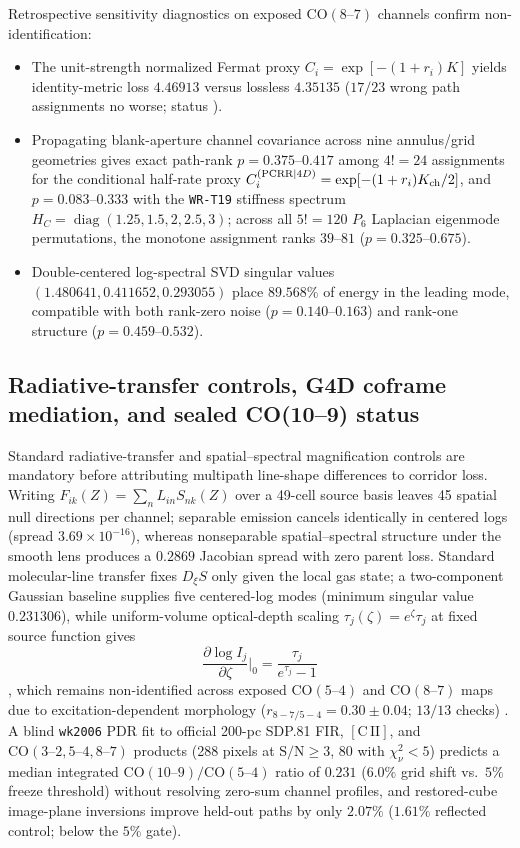 \documentclass[11pt]{article}
\begin{document}
Retrospective sensitivity diagnostics on exposed $\mathrm{CO}(8\text{--}7)$
channels confirm non-identification:
\begin{itemize}[leftmargin=*]
\item The unit-strength normalized Fermat proxy $C_i=\exp[-(1+r_i)K]$ yields
identity-metric loss $4.46913$ versus lossless $4.35135$ ($17/23$ wrong path
assignments no worse; status ).
\item Propagating blank-aperture channel covariance across nine annulus/grid
geometries gives exact path-rank $p=0.375$--$0.417$ among $4!=24$ assignments
for the conditional half-rate proxy
$C_i^{(\mathrm{PCRR}|4D)}=\exp[-(1+r_i)K_{\rm ch}/2]$, and $p=0.083$--$0.333$
with the \texttt{WR-T19} stiffness spectrum
$H_C=\operatorname{diag}(1.25,1.5,2,2.5,3)$; across all $5!=120$ $P_6$
Laplacian eigenmode permutations, the monotone assignment ranks $39$--$81$
($p=0.325$--$0.675$).
\item Double-centered log-spectral SVD singular values
$(1.480641,0.411652,0.293055)$ place $89.568\%$ of energy in the leading mode,
compatible with both rank-zero noise ($p=0.140$--$0.163$) and rank-one structure
($p=0.459$--$0.532$).
\end{itemize}

\subsection{Radiative-transfer controls, G4D coframe mediation, and sealed CO(10--9) status}

Standard radiative-transfer and spatial--spectral magnification controls are
mandatory before attributing multipath line-shape differences to corridor loss.
Writing $F_{ik}(Z)=\sum_n L_{in}S_{nk}(Z)$ over a 49-cell source basis leaves
45 spatial null directions per channel; separable emission cancels identically
in centered logs (spread $3.69\times 10^{-16}$), whereas nonseparable
spatial--spectral structure under the smooth lens produces a $0.2869$ Jacobian
spread with zero parent loss. Standard molecular-line transfer
\cite{vanDerTak2007RADEX,MangumShirley2015} fixes $D_\xi S$ only given the local
gas state; a two-component Gaussian baseline supplies five centered-log modes
(minimum singular value $0.231306$), while uniform-volume optical-depth scaling
$\tau_j(\zeta)=e^\zeta\tau_j$ at fixed source function gives
\[
\frac{\partial\log I_j}{\partial\zeta}\bigg|_0=\frac{\tau_j}{e^{\tau_j}-1}
\]
\cite{MangumShirley2015}, which remains non-identified across exposed
$\mathrm{CO}(5\text{--}4)$ and $\mathrm{CO}(8\text{--}7)$ maps due to
excitation-dependent morphology ($r_{8-7/5-4}=0.30\pm 0.04$; $13/13$ checks)
\cite{Rybak2015SDP81CO}. A blind \texttt{wk2006} PDR fit to official 200-pc
SDP.81 FIR, $[\mathrm{C\,II}]$, and $\mathrm{CO}(3\text{--}2,5\text{--}4,8\text{--}7)$
products \cite{Rybak2020FullOfOrions} (288 pixels at $\mathrm{S/N}\ge 3$, 80
with $\chi_\nu^2<5$) predicts a median integrated
$\mathrm{CO}(10\text{--}9)/\mathrm{CO}(5\text{--}4)$ ratio of $0.231$ ($6.0\%$
grid shift vs.\ $5\%$ freeze threshold) without resolving zero-sum channel
profiles, and restored-cube image-plane inversions improve held-out paths by
only $2.07\%$ ($1.61\%$ reflected control; below the $5\%$ gate).
\end{document}
